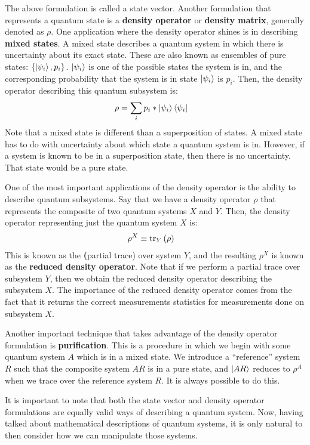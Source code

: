 The above formulation is called a state vector. Another formulation that represents a quantum state is a \textbf{density operator} or \textbf{density matrix}, generally denoted as $\rho$. One application where the density operator shines is in describing \textbf{mixed states}. A mixed state describes a quantum system in which there is uncertainty about its exact state. These are also known as ensembles of pure states: $\{\ket{\psi_i}, p_i\}$. $\ket{\psi_i}$ is one of the possible states the system is in, and the corresponding probability that the system is in state $\ket{\psi_i}$ is $p_i$. Then, the density operator describing this quantum subsystem is:
\begin{align}
    \rho &= \sum_{i} p_i * \ket{\psi_i}\bra{\psi_i}
\end{align}
Note that a mixed state is different than a superposition of states. A mixed state has to do with uncertainty about which state a quantum system is in. However, if a system is known to be in a superposition state, then there is no uncertainty. That state would be a pure state.

One of the most important applications of the density operator is the ability to describe quantum subsystems. Say that we have a density operator $\rho$ that represents the composite of two quantum systems $X$ and $Y$. Then, the density operator representing just the quantum system $X$ is:
\begin{align}
    \rho^X &\equiv \trace[Y]{\rho}
\end{align}
This is known as the \textbf(partial trace) over system $Y$, and the resulting $\rho^X$ is known as the \textbf{reduced density operator}. Note that if we perform a partial trace over subsystem $Y$, then we obtain the reduced density operator describing the subsystem $X$. The importance of the reduced density operator comes from the fact that it returns the correct measurements statistics for measurements done on subsystem $X$.

Another important technique that takes advantage of the density operator formulation is \textbf{purification}. This is a procedure in which we begin with some quantum system $A$ which is in a mixed state. We introduce a ``reference'' system $R$ such that the composite system $AR$ is in a pure state, and $\ket{AR}$ reduces to $\rho^A$ when we trace over the reference system $R$. It is always possible to do this.

It is important to note that both the state vector and density operator formulations are equally valid ways of describing a quantum system. Now, having talked about mathematical descriptions of quantum systems, it is only natural to then consider how we can manipulate those systems. 

